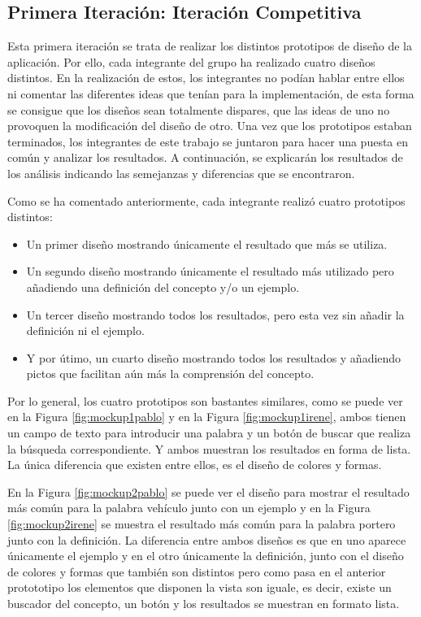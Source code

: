 \subsection{Primera Iteración: Iteración Competitiva}
\label{cap:subsec:iteracionCompetitiva}

Esta primera iteración se trata de realizar los distintos prototipos de diseño de la aplicación. Por ello, cada integrante del grupo ha realizado cuatro diseños distintos. En la realización de estos, los integrantes no podían hablar entre ellos ni comentar las diferentes ideas que tenían para la implementación, de esta forma se consigue que los diseños sean totalmente dispares, que las ideas de uno no provoquen la modificación del diseño de otro.
Una vez que los prototipos estaban terminados, los integrantes de este trabajo se juntaron para hacer una puesta en común y analizar los resultados. A continuación, se explicarán los resultados de los análisis indicando las semejanzas y diferencias que se encontraron.

Como se ha comentado anteriormente, cada integrante realizó cuatro prototipos distintos:
\begin{itemize}
	\item Un primer diseño mostrando únicamente el resultado que más se utiliza.
	\item Un segundo diseño mostrando únicamente el resultado más utilizado pero añadiendo una definición del concepto y/o un ejemplo.
	\item Un tercer diseño mostrando todos los resultados, pero esta vez sin añadir la definición ni el ejemplo.
	\item Y por útimo, un cuarto diseño mostrando todos los resultados y añadiendo pictos que facilitan aún más la comprensión del concepto.
	
\end{itemize}

Por lo general, los cuatro prototipos son bastantes similares, como se puede ver en la Figura \ref{fig:mockup1pablo} y en la Figura \ref{fig:mockup1irene}, ambos tienen un campo de texto para introducir una palabra y un botón de buscar que realiza la búsqueda correspondiente. Y ambos muestran los resultados en forma de lista. La única diferencia que existen entre ellos, es el diseño de colores y formas.

En la Figura \ref{fig:mockup2pablo} se puede ver el diseño para mostrar el resultado más común para la palabra vehículo junto con un ejemplo y en la Figura \ref{fig:mockup2irene} se muestra el resultado más común para la palabra portero junto con la definición. La diferencia entre ambos diseños es que en uno aparece únicamente el ejemplo y en el otro únicamente la definición, junto con el diseño de colores y formas que también son distintos pero como pasa en el anterior protototipo los elementos que disponen la vista son iguale, es decir, existe un buscador del concepto, un botón y los resultados se muestran en formato lista.

